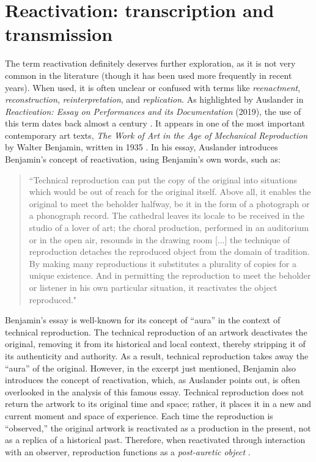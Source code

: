 \section{Reactivation: transcription and transmission}
The term reactivation definitely deserves further exploration, as it is not very common in the literature (though it has been used more frequently in recent years). When used, it is often unclear or confused with terms like \textit{reenactment}, \textit{reconstruction}, \textit{reinterpretation}, and \textit{replication}. As highlighted by Auslander in \textit{Reactivation: Essay on Performances and its Documentation} (2019), the use of this term dates back almost a century \cite{auslander2018reactivations}. It appears in one of the most important contemporary art texts, \textit{The Work of Art in the Age of Mechanical Reproduction} by Walter Benjamin, written in 1935 \cite{benjamin1935work}. In his essay, Auslander introduces Benjamin's concept of reactivation, using Benjamin's own words, such as:
\begin{quote}
    “Technical reproduction can put the copy of the original into situations which would be out of reach for the original itself. Above all, it enables the original to meet the beholder halfway, be it in the form of a photograph or a phonograph record. The cathedral leaves its locale to be received in the studio of a lover of art; the choral production, performed in an auditorium or in the open air, resounds in the drawing room [...] the technique of reproduction detaches the reproduced object from the domain of tradition. By making many reproductions it substitutes a plurality of copies for a unique existence. And in permitting the reproduction to meet the beholder or listener in his own particular situation, it reactivates the object reproduced." \cite{benjamin1935work}
\end{quote}
Benjamin's essay is well-known for its concept of ``aura'' in the context of technical reproduction. The technical reproduction of an artwork deactivates the original, removing it from its historical and local context, thereby stripping it of its authenticity and authority. As a result, technical reproduction takes away the ``aura'' of the original. However, in the excerpt just mentioned, Benjamin also introduces the concept of reactivation, which, as Auslander points out, is often overlooked in the analysis of this famous essay. Technical reproduction does not return the artwork to its original time and space; rather, it places it in a new and current moment and space of experience. Each time the reproduction is ``observed,'' the original artwork is reactivated as a production in the present, not as a replica of a historical past. Therefore, when reactivated through interaction with an observer, reproduction functions as a \textit{post-auretic object} \cite{auslander2018reactivations}.\\
